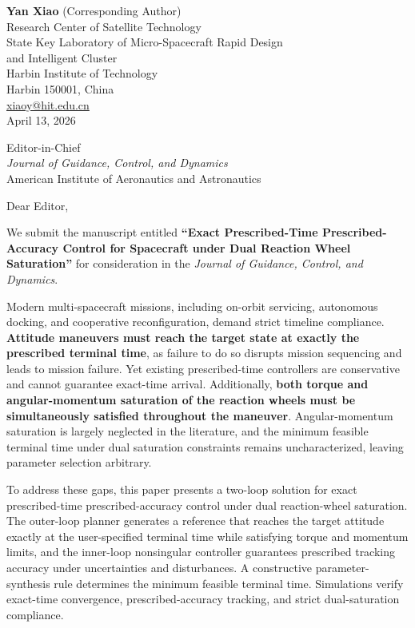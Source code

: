 \documentclass[12pt]{article}
\begin{document}
\begin{flushright}
\textbf{Yan Xiao} (Corresponding Author)\\
Research Center of Satellite Technology\\
State Key Laboratory of Micro-Spacecraft Rapid Design\\
and Intelligent Cluster\\
Harbin Institute of Technology\\
Harbin 150001, China\\
\href{mailto:xiaoy@hit.edu.cn}{xiaoy@hit.edu.cn}\\[6pt]
April 13, 2026
\end{flushright}

\bigskip

Editor-in-Chief\\
\textit{Journal of Guidance, Control, and Dynamics}\\
American Institute of Aeronautics and Astronautics

\bigskip

Dear Editor,

We submit the manuscript entitled \textbf{``Exact Prescribed-Time
Prescribed-Accuracy Control for Spacecraft under Dual Reaction Wheel
Saturation''} for consideration in the \textit{Journal of Guidance,
Control, and Dynamics}.

Modern multi-spacecraft missions, including on-orbit servicing, autonomous
docking, and cooperative reconfiguration, demand strict timeline compliance.
\textbf{Attitude maneuvers must reach the target state at exactly the
prescribed terminal time}, as failure to do so disrupts mission sequencing and
leads to mission failure. Yet existing prescribed-time controllers are
conservative and cannot guarantee exact-time arrival. Additionally, \textbf{both torque and
angular-momentum saturation of the reaction wheels must be simultaneously
satisfied throughout the maneuver}. Angular-momentum saturation is largely neglected in the literature,
and the minimum feasible terminal time under dual saturation constraints
remains uncharacterized, leaving parameter selection arbitrary.

To address these gaps, this paper presents a two-loop solution for exact
prescribed-time prescribed-accuracy control under dual reaction-wheel
saturation. The outer-loop planner generates a reference that reaches
the target attitude exactly at the user-specified terminal time while satisfying
torque and momentum limits, and the inner-loop nonsingular controller guarantees
prescribed tracking accuracy under uncertainties and disturbances. A
constructive parameter-synthesis rule determines the minimum feasible terminal
time. Simulations verify exact-time convergence, prescribed-accuracy tracking,
and strict dual-saturation compliance.
\end{document}
